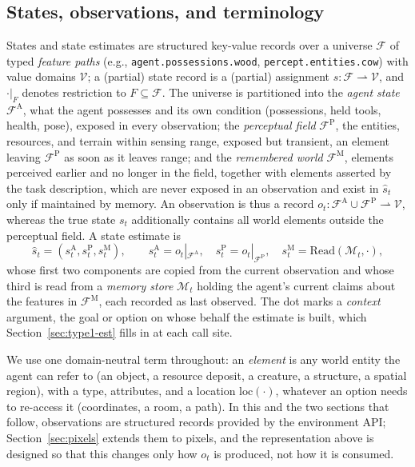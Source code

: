 \documentclass[10pt]{article}
\newcommand{\calF}{\mathcal{F}}
\newcommand{\calV}{\mathcal{V}}
\newcommand{\calM}{\mathcal{M}}
\newcommand{\shat}{\hat{s}}
\newcommand{\sA}{s^{\mathrm{A}}}
\newcommand{\sP}{s^{\mathrm{P}}}
\newcommand{\sM}{s^{\mathrm{M}}}
\newcommand{\FA}{\calF^{\mathrm{A}}}
\newcommand{\FP}{\calF^{\mathrm{P}}}
\newcommand{\FM}{\calF^{\mathrm{M}}}
\newcommand{\Read}{\mathrm{Read}}
\newcommand{\loc}{\mathrm{loc}}
\begin{document}
\subsection{States, observations, and terminology}
\label{sec:states}

States and state estimates are structured key-value records over a universe $\calF$ of typed \emph{feature paths} (e.g., \texttt{agent.possessions.wood}, \texttt{percept.entities.cow}) with value domains $\calV$; a (partial) state record is a (partial) assignment $\shat:\calF\rightharpoonup\calV$, and $\cdot|_F$ denotes restriction to $F\subseteq\calF$. The universe is partitioned into the \emph{agent state} $\FA$, what the agent possesses and its own condition (possessions, held tools, health, pose), exposed in every observation; the \emph{perceptual field} $\FP$, the entities, resources, and terrain within sensing range, exposed but transient, an element leaving $\FP$ as soon as it leaves range; and the \emph{remembered world} $\FM$, elements perceived earlier and no longer in the field, together with elements asserted by the task description, which are never exposed in an observation and exist in $\shat_t$ only if maintained by memory. An observation is thus a record $o_t:\FA\cup\FP\rightharpoonup\calV$, whereas the true state $s_t$ additionally contains all world elements outside the perceptual field. A state estimate is
\begin{equation}
\shat_t=(\sA_t,\sP_t,\sM_t),\qquad \sA_t=o_t|_{\FA},\quad \sP_t=o_t|_{\FP},\quad \sM_t=\Read(\calM_t,\cdot),
\label{eq:state-estimate}
\end{equation}
whose first two components are copied from the current observation and whose third is read from a \emph{memory store} $\calM_t$ holding the agent's current claims about the features in $\FM$, each recorded as last observed. The dot marks a \emph{context} argument, the goal or option on whose behalf the estimate is built, which Section~\ref{sec:type1-est} fills in at each call site.

We use one domain-neutral term throughout: an \emph{element} is any world entity the agent can refer to (an object, a resource deposit, a creature, a structure, a spatial region), with a type, attributes, and a location $\loc(\cdot)$, whatever an option needs to re-access it (coordinates, a room, a path). In this and the two sections that follow, observations are structured records provided by the environment API; Section~\ref{sec:pixels} extends them to pixels, and the representation above is designed so that this changes only how $o_t$ is produced, not how it is consumed.
\end{document}
